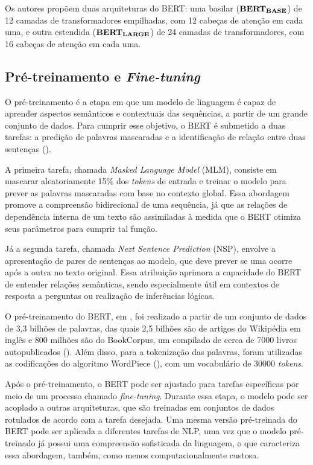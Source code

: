 Os autores \citet{bert2018} propõem duas arquiteturas do BERT: uma basilar ($\text{\textbf{BERT}}_{\text{\textbf{BASE}}}$) de 12 camadas de transformadores empilhadas, com 12 cabeças de atenção em cada uma, e outra estendida ($\text{\textbf{BERT}}_{\text{\textbf{LARGE}}}$) de 24 camadas de transformadores, com 16 cabeças de atenção em cada uma.


\subsection{Pré-treinamento e \textit{Fine-tuning}}

O pré-treinamento é a etapa em que um modelo de linguagem é capaz de aprender aspectos semânticos e contextuais das sequências, a partir de um grande conjunto de dados. Para cumprir esse objetivo, o BERT é submetido a duas tarefas: a predição de palavras mascaradas e a identificação de relação entre duas sentenças (\cite{zhang2023dive}).

A primeira tarefa, chamada \textit{Masked Language Model} (MLM), consiste em mascarar aleatoriamente 15\% dos \textit{tokens} de entrada e treinar o modelo para prever as palavras mascaradas com base no contexto global.  Essa abordagem promove a compreensão bidirecional de uma sequência, já que as relações de dependência interna de um texto são assimiladas à medida que o BERT otimiza seus parâmetros para cumprir tal função.

Já a segunda tarefa, chamada \textit{Next Sentence Prediction} (NSP), envolve a apresentação de pares de sentenças ao modelo, que deve prever se uma ocorre após a outra no texto original. Essa atribuição aprimora a capacidade do BERT de entender relações semânticas, sendo especialmente útil em contextos de resposta a perguntas ou realização de inferências lógicas.

O pré-treinamento do BERT, em \cite{bert2018}, foi realizado a partir de um conjunto de dados de 3,3 bilhões de palavras, das quais 2,5 bilhões são de artigos do Wikipédia em inglês e 800 milhões são do BookCorpus, um compilado de cerca de 7000 livros autopublicados (\cite{zhu2015aligning}). Além disso, para a tokenização das palavras, foram utilizadas as codificações do algoritmo WordPiece (\cite{wu2016googles}), com um vocabulário de 30000 \textit{tokens}.

Após o pré-treinamento, o BERT pode ser ajustado para tarefas específicas por meio de um processo chamado \textit{fine-tuning}. Durante essa etapa, o modelo pode ser acoplado a outras arquiteturas, que são treinadas em conjuntos de dados rotulados de acordo com a tarefa desejada. Uma mesma versão pré-treinada do BERT pode ser aplicada a diferentes tarefas de NLP, uma vez que o modelo pré-treinado já possui uma compreensão sofisticada da linguagem, o que caracteriza essa abordagem, também, como menos computacionalmente custosa.

